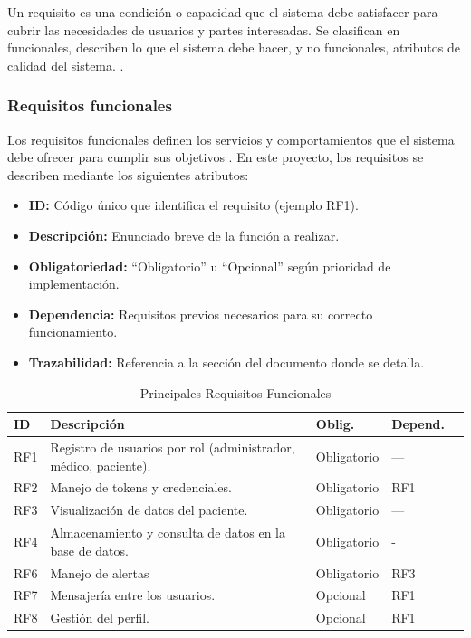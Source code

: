 \documentclass[12pt, a4paper]{article}
\begin{document}
		Un requisito es una condición o capacidad que el sistema debe satisfacer para cubrir las necesidades de usuarios y partes interesadas. Se clasifican en funcionales, describen lo que el sistema debe hacer, y no funcionales, atributos de calidad del sistema. \cite{sommerville}.
	
			\subsubsection{Requisitos funcionales}
			
			Los requisitos funcionales definen los servicios y comportamientos que el sistema debe ofrecer para cumplir sus objetivos \cite{ieee830}. En este proyecto, los requisitos se describen mediante los siguientes atributos:
			
			\begin{itemize}
				\item \textbf{ID:} Código único que identifica el requisito (ejemplo RF1).
				\item \textbf{Descripción:} Enunciado breve de la función a realizar.
				\item \textbf{Obligatoriedad:} “Obligatorio” u “Opcional” según prioridad de implementación.
				\item \textbf{Dependencia:} Requisitos previos necesarios para su correcto funcionamiento.
				\item \textbf{Trazabilidad:} Referencia a la sección del documento donde se detalla.
			\end{itemize}

			
			\begin{table}[ht]
				\centering
				\caption{Principales Requisitos Funcionales}
				\begin{tabular}{|p{1.5cm}|p{6cm}|p{2cm}|p{2cm}|p{3cm}|}
					\hline
					\textbf{ID} & \textbf{Descripción} & \textbf{Oblig.} & \textbf{Depend.} \\
					\hline
					RF1 & Registro de usuarios por rol (administrador, médico, paciente). & Obligatorio & —    \\
					\hline
					RF2 & Manejo de tokens y credenciales.                       & Obligatorio & RF1 \\
					\hline
					RF3 & Visualización de datos del paciente. & Obligatorio & —    \\
					\hline
					RF4 & Almacenamiento y consulta de datos en la base de datos.         & Obligatorio & - \\
					\hline
					RF6 & Manejo de alertas             & Obligatorio & RF3  \\
					\hline
					RF7 & Mensajería entre los usuarios.                              & Opcional   & RF1 \\
					\hline
					RF8 & Gestión del perfil.               & Opcional & RF1 \\
					\hline
				\end{tabular}
			\end{table}
	
\end{document}
